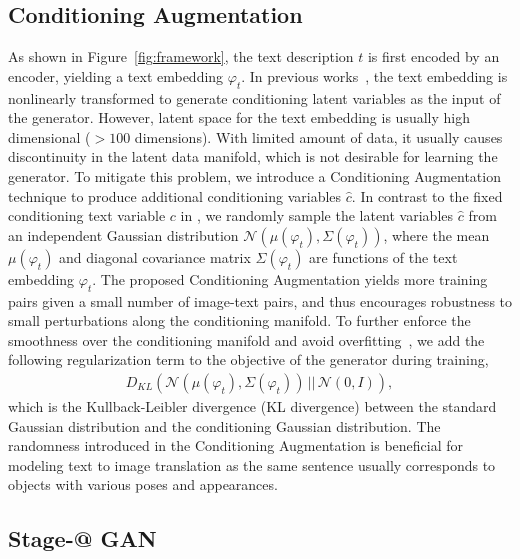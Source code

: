 \documentclass[10pt,twocolumn,letterpaper]{article}
\makeatletter
\newcommand{\Rmnum}[1]{\expandafter\@slowromancap\romannumeral #1@}
\makeatother
\begin{document}
\subsection{Conditioning Augmentation}
\vspace{-5pt}
As shown in Figure~\ref{fig:framework}, the text description $t$ is first encoded by an encoder, yielding a text embedding $\varphi_{t}$. In previous works~\cite{reed2016generative,reed2016learning}, the text embedding is nonlinearly transformed to generate conditioning latent variables as the input of the generator. However, latent space for the text embedding is usually high dimensional ($>100$ dimensions). With limited amount of data, it usually causes discontinuity in the latent data manifold, which is not desirable for learning the generator. To mitigate this problem, we introduce a Conditioning Augmentation technique to produce additional conditioning variables $\hat{c}$. In contrast to the fixed conditioning text variable $c$ in \cite{reed2016generative,reed2016learning}, we randomly sample the latent variables $\hat{c}$ from an independent Gaussian distribution $\mathcal{N}(\mu(\varphi_{t}), \Sigma(\varphi_{t}))$, where the mean $\mu(\varphi_{t})$ and diagonal covariance matrix $\Sigma(\varphi_{t})$ are functions of the text embedding $\varphi_{t}$. The proposed Conditioning Augmentation yields more training pairs given a small number of image-text pairs, and thus encourages robustness to small perturbations along the conditioning manifold. To further enforce the smoothness over the conditioning manifold and avoid overfitting~\cite{Doersch16, LarsenSLW16}, we add the following regularization term to the objective of the generator during training, 
\begin{equation}\label{eq:GaussianKL}
\begin{aligned}
D_{KL}(\mathcal{N}(\mu(\varphi_{t}), \Sigma(\varphi_{t})) \, || \, \mathcal{N}(0, I)),
\end{aligned}
\end{equation}
which is the Kullback-Leibler divergence (KL divergence) between the standard Gaussian distribution and the conditioning Gaussian distribution. 
The randomness introduced in the Conditioning Augmentation is beneficial for modeling text to image translation as the same sentence usually corresponds to objects with various poses and appearances. 



\subsection{Stage-\Rmnum{1} GAN}
\vspace{-5pt}
\end{document}
